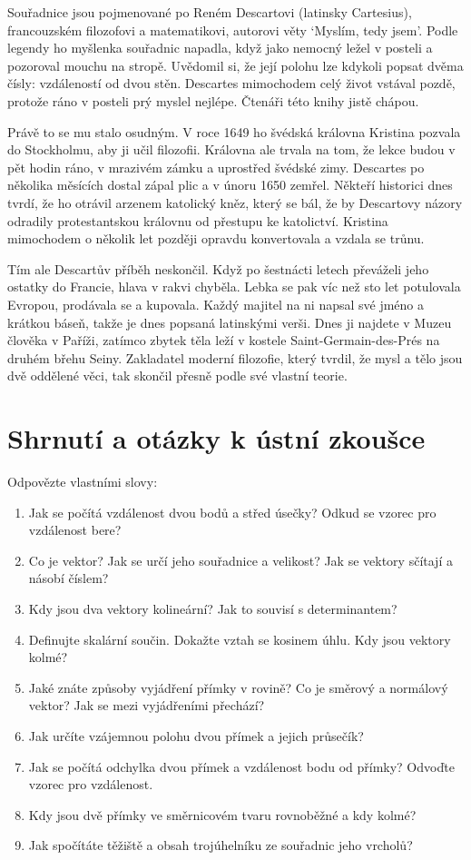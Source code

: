 Souřadnice jsou pojmenované po Reném Descartovi (latinsky Cartesius), francouzském filozofovi a matematikovi, autorovi věty `Myslím, tedy jsem'. Podle legendy ho myšlenka souřadnic napadla, když jako nemocný ležel v posteli a pozoroval mouchu na stropě. Uvědomil si, že její polohu lze kdykoli popsat dvěma čísly: vzdáleností od dvou stěn. Descartes mimochodem celý život vstával pozdě, protože ráno v posteli prý myslel nejlépe. Čtenáři této knihy jistě chápou.

Právě to se mu stalo osudným. V roce 1649 ho švédská královna Kristina pozvala do Stockholmu, aby ji učil filozofii. Královna ale trvala na tom, že lekce budou v pět hodin ráno, v mrazivém zámku a uprostřed švédské zimy. Descartes po několika měsících dostal zápal plic a v únoru 1650 zemřel. Někteří historici dnes tvrdí, že ho otrávil arzenem katolický kněz, který se bál, že by Descartovy názory odradily protestantskou královnu od přestupu ke katolictví. Kristina mimochodem o několik let později opravdu konvertovala a vzdala se trůnu.

Tím ale Descartův příběh neskončil. Když po šestnácti letech převáželi jeho ostatky do Francie, hlava v rakvi chyběla. Lebka se pak víc než sto let potulovala Evropou, prodávala se a kupovala. Každý majitel na ni napsal své jméno a krátkou báseň, takže je dnes popsaná latinskými verši. Dnes ji najdete v Muzeu člověka v Paříži, zatímco zbytek těla leží v kostele Saint-Germain-des-Prés na druhém břehu Seiny. Zakladatel moderní filozofie, který tvrdil, že mysl a tělo jsou dvě oddělené věci, tak skončil přesně podle své vlastní teorie.

\section{Shrnutí a otázky k ústní zkoušce}

\begin{problem}
  Odpovězte vlastními slovy:
  \begin{enumerate}
    \item Jak se počítá vzdálenost dvou bodů a střed úsečky? Odkud se vzorec pro vzdálenost bere?
    \item Co je vektor? Jak se určí jeho souřadnice a velikost? Jak se vektory sčítají a násobí číslem?
    \item Kdy jsou dva vektory kolineární? Jak to souvisí s determinantem?
    \item Definujte skalární součin. Dokažte vztah se kosinem úhlu. Kdy jsou vektory kolmé?
    \item Jaké znáte způsoby vyjádření přímky v rovině? Co je směrový a normálový vektor? Jak se mezi vyjádřeními přechází?
    \item Jak určíte vzájemnou polohu dvou přímek a jejich průsečík?
    \item Jak se počítá odchylka dvou přímek a vzdálenost bodu od přímky? Odvoďte vzorec pro vzdálenost.
    \item Kdy jsou dvě přímky ve směrnicovém tvaru rovnoběžné a kdy kolmé?
    \item Jak spočítáte těžiště a obsah trojúhelníku ze souřadnic jeho vrcholů?
  \end{enumerate}
\end{problem}
